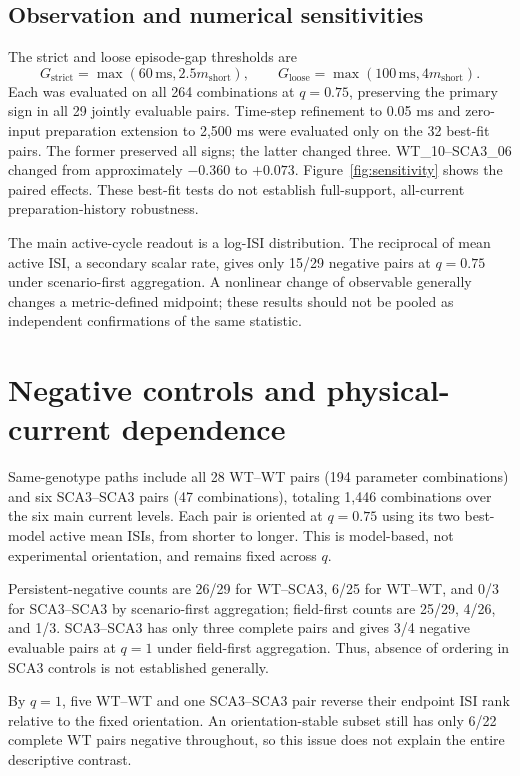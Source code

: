 \documentclass[11pt,a4paper]{article}
\begin{document}
\subsection*{Observation and numerical sensitivities}
The strict and loose episode-gap thresholds are
\[G_{\mathrm{strict}}=\max(60\,\mathrm{ms},2.5m_{\mathrm{short}}),\qquad G_{\mathrm{loose}}=\max(100\,\mathrm{ms},4m_{\mathrm{short}}).\]
Each was evaluated on all 264 combinations at $q=0.75$, preserving the primary sign in all 29 jointly evaluable pairs. Time-step refinement to 0.05 ms and zero-input preparation extension to 2,500 ms were evaluated only on the 32 best-fit pairs. The former preserved all signs; the latter changed three. WT\_10--SCA3\_06 changed from approximately $-0.360$ to $+0.073$. Figure~\ref{fig:sensitivity} shows the paired effects. These best-fit tests do not establish full-support, all-current preparation-history robustness.

The main active-cycle readout is a log-ISI distribution. The reciprocal of mean active ISI, a secondary scalar rate, gives only 15/29 negative pairs at $q=0.75$ under scenario-first aggregation. A nonlinear change of observable generally changes a metric-defined midpoint; these results should not be pooled as independent confirmations of the same statistic.

\section{Negative controls and physical-current dependence}\label{s:controls}
Same-genotype paths include all 28 WT--WT pairs (194 parameter combinations) and six SCA3--SCA3 pairs (47 combinations), totaling 1,446 combinations over the six main current levels. Each pair is oriented at $q=0.75$ using its two best-model active mean ISIs, from shorter to longer. This is model-based, not experimental orientation, and remains fixed across $q$.

Persistent-negative counts are 26/29 for WT--SCA3, 6/25 for WT--WT, and 0/3 for SCA3--SCA3 by scenario-first aggregation; field-first counts are 25/29, 4/26, and 1/3. SCA3--SCA3 has only three complete pairs and gives 3/4 negative evaluable pairs at $q=1$ under field-first aggregation. Thus, absence of ordering in SCA3 controls is not established generally.

By $q=1$, five WT--WT and one SCA3--SCA3 pair reverse their endpoint ISI rank relative to the fixed orientation. An orientation-stable subset still has only 6/22 complete WT pairs negative throughout, so this issue does not explain the entire descriptive contrast.
\end{document}

